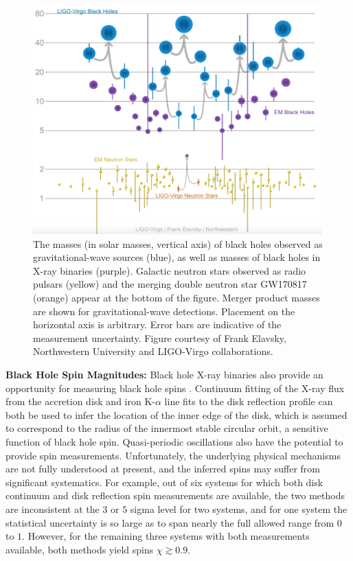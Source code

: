 \documentclass[iop,onecolumn]{revtex4}
\begin{document}
\begin{figure}
	\centering
	\includegraphics[width=0.99\textwidth]{Graveyard.png}%
	\caption{\label{fig:BHmasses}  The masses (in solar masses, vertical axis) of black holes observed as gravitational-wave sources (blue), as well as masses of black holes in X-ray binaries (purple).  Galactic neutron stars observed as radio pulsars (yellow) and the merging double neutron star GW170817 (orange) appear at the bottom of the figure.  Merger product masses are shown for gravitational-wave detections. Placement on the horizontal axis is arbitrary.  Error bars are indicative of the measurement uncertainty.  Figure courtesy of Frank Elavsky, Northwestern University and LIGO-Virgo collaborations.}
\end{figure}


\textbf{Black Hole Spin Magnitudes:} Black hole X-ray binaries also provide an opportunity for measuring black hole spins \citep[see][for a recent review]{MillerMiller:2015}.  Continuum fitting of the X-ray flux from the accretion disk and iron K-$\alpha$ line fits to the disk reflection profile can both be used to infer the location of the inner edge of the disk, which is assumed to correspond to the radius of the innermost stable circular orbit, a sensitive function of black hole spin.  Quasi-periodic oscillations also have the potential to provide spin measurements.  Unfortunately, the underlying physical mechanisms are not fully understood at present, and the inferred spins may suffer from significant systematics.  For example, out of six systems for which both disk continuum and disk reflection spin measurements are available, the two methods are inconsistent at the $3$ or $5$ sigma level for two systems, and for one system the statistical uncertainty is so large as to span nearly the full allowed range from $0$ to $1$.  However, for the remaining three systems with both measurements available, both methods yield spins $\chi \gtrsim 0.9$.  
\end{document}
